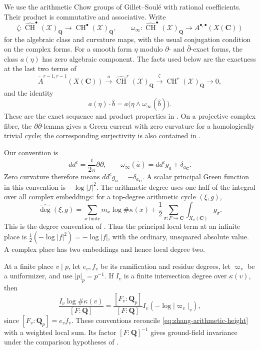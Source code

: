 \documentclass[11pt,a4paper]{article}
\theoremstyle{definition}
\numberwithin{equation}{section}
\newcommand{\CH}{\operatorname{CH}}
\newcommand{\Q}{\mathbf Q}
\newcommand{\C}{\mathbf C}
\newcommand{\hdeg}{\widehat{\operatorname{deg}}}
\begin{document}
We use the arithmetic Chow groups of Gillet--Soul\'e with rational coefficients. Their product is commutative and associative. Write
\[
 \zeta:\widehat{\CH}^{\bullet}(\mathcal X)_\Q
       \longrightarrow\CH^{\bullet}(\mathcal X)_\Q,
 \qquad
 \omega_\infty:\widehat{\CH}^{\bullet}(\mathcal X)_\Q
       \longrightarrow A^{\bullet,\bullet}(X(\C))
\]
for the algebraic class and curvature maps, with the usual conjugation condition on the complex forms. For a smooth form $\eta$ modulo $\partial$- and $\bar\partial$-exact forms, the class $a(\eta)$ has zero algebraic component. The facts used below are the exactness at the last two terms of
\begin{equation}\label{eq:zhang-arithmetic-exact}
 \widetilde A^{r-1,r-1}(X(\C))
 \xrightarrow{a}\widehat{\CH}^r(\mathcal X)_\Q
 \xrightarrow{\zeta}\CH^r(\mathcal X)_\Q\longrightarrow0,
\end{equation}
and the identity
\begin{equation}\label{eq:zhang-form-product}
 a(\eta)\cdot\widehat b=a\bigl(\eta\wedge\omega_\infty(\widehat b)\bigr).
\end{equation}
These are the exact sequence and product properties in \cite[Theorem 3.3.5, Theorem 4.2.3 and \S4.2.11]{GS}. On a projective complex fibre, the $\partial\bar\partial$-lemma gives a Green current with zero curvature for a homologically trivial cycle; the corresponding surjectivity is also contained in \cite[Theorem 3.3.5(iii)]{GS}.

Our convention is
\[
 dd^c=\frac{i}{2\pi}\partial\bar\partial,
 \qquad \omega_\infty(\widehat a)=dd^cg_a+\delta_{a_\C}.
\]
Zero curvature therefore means $dd^cg_a=-\delta_{a_\C}$. A scalar principal Green function in this convention is $-\log|f|^2$. The arithmetic degree uses one half of the integral over all complex embeddings: for a top-degree arithmetic cycle $(\xi,g)$,
\begin{equation}\label{eq:zhang-degree-convention}
 \hdeg(\xi,g)
 =\sum_{x\text{ finite}}m_x\log\#\kappa(x)
   +\frac12\sum_{\sigma:F\hookrightarrow\C}
      \int_{X_\sigma(\C)}g_\sigma.
\end{equation}
This is the degree convention of \cite[\S3.4.3]{GS}. Thus the principal local term at an infinite place is $\tfrac12(-\log|f|^2)=-\log|f|$, with the ordinary, unsquared absolute value. A complex place has two embeddings and hence local degree two.

At a finite place $v\mid p$, let $e_v,f_v$ be its ramification and residue degrees, let $\varpi_v$ be a uniformizer, and use $|p|_p=p^{-1}$. If $I_v$ is a finite intersection degree over $\kappa(v)$, then
\[
 \frac{I_v\log\#\kappa(v)}{[F:\Q]}
 =\frac{[F_v:\Q_p]}{[F:\Q]}
      I_v(-\log|\varpi_v|_v),
\]
since $[F_v:\Q_p]=e_vf_v$. These conventions reconcile \eqref{eq:zhang-arithmetic-height} with a weighted local sum. Its factor $[F:\Q]^{-1}$ gives ground-field invariance under the comparison hypotheses of .
\end{document}
